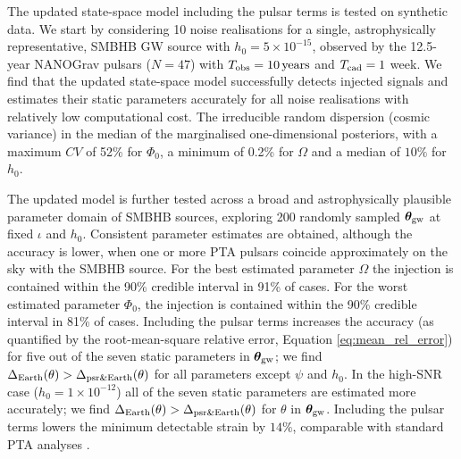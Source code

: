 \documentclass[fleqn,usenatbib,useAMS]{mnras}
\begin{document}
The updated state-space model including the pulsar terms is tested on synthetic data. We start by considering 10 noise realisations for a single, astrophysically representative, SMBHB GW source with $h_0 = 5 \times 10^{-15}$, observed by the 12.5-year NANOGrav pulsars ($N=47$) with $T_{\rm obs} = 10 \, {\rm years}$ and $T_{\rm cad} = 1$ week. We find that the updated state-space model successfully detects injected signals and estimates their static parameters accurately for all noise realisations with relatively low computational cost. The irreducible random dispersion (cosmic variance) in the median of the marginalised one-dimensional posteriors, with a maximum $CV$ of 52\% for $\Phi_0$, a minimum of 0.2\% for $\Omega$ and a median of $10 \%$ for $h_0$. \newline 

The updated model is further tested across a broad and astrophysically plausible parameter domain of SMBHB sources, exploring 200 randomly sampled $\boldsymbol{\theta}_{\rm gw}$ at fixed $\iota$ and $h_0$. Consistent parameter estimates are obtained, although the accuracy is lower, when one or more PTA pulsars coincide approximately on the sky with the SMBHB source. For the best estimated parameter $\Omega$ the injection is contained within the 90\% credible interval in 91\% of cases. For the worst estimated parameter $\Phi_0$, the injection is contained within the 90\% credible interval in 81\% of cases. Including the pulsar terms increases the accuracy (as quantified by the root-mean-square relative error, Equation \eqref{eq:mean_rel_error}) for five out of the seven static parameters in $\boldsymbol{\theta}_{\rm gw}$; we find $\Delta_{\rm Earth}(\theta) > \Delta_{\rm psr \& Earth}(\theta)$ for all parameters except $\psi$ and $h_0$. In the high-SNR case ($h_0 = 1 \times 10^{-12}$) all of the seven static parameters are estimated more accurately; we find $\Delta_{\rm Earth}(\theta) > \Delta_{\rm psr \& Earth}(\theta)$ for $\theta$ in $\boldsymbol{\theta}_{\rm gw}$. Including the pulsar terms lowers the minimum detectable strain by $14\%$, comparable with standard PTA analyses \citep[e.g.][]{Zhupulsarterms}. \newline 
\end{document}

